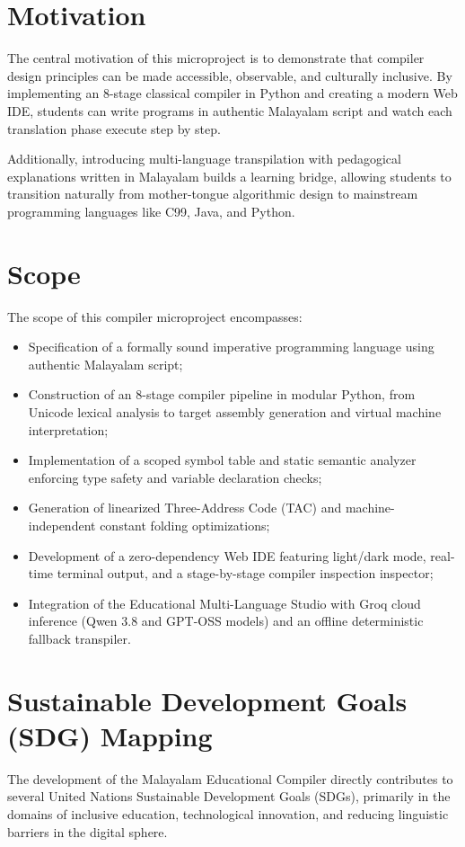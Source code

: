 \documentclass[12pt,a4paper]{report}
\begin{document}
\section{Motivation}
The central motivation of this microproject is to demonstrate that compiler design principles can be made accessible, observable, and culturally inclusive. By implementing an 8-stage classical compiler in Python and creating a modern Web IDE, students can write programs in authentic Malayalam script and watch each translation phase execute step by step.

Additionally, introducing multi-language transpilation with pedagogical explanations written in Malayalam builds a learning bridge, allowing students to transition naturally from mother-tongue algorithmic design to mainstream programming languages like C99, Java, and Python.

\section{Scope}
The scope of this compiler microproject encompasses:
\begin{itemize}
    \item Specification of a formally sound imperative programming language using authentic Malayalam script;
    \item Construction of an 8-stage compiler pipeline in modular Python, from Unicode lexical analysis to target assembly generation and virtual machine interpretation;
    \item Implementation of a scoped symbol table and static semantic analyzer enforcing type safety and variable declaration checks;
    \item Generation of linearized Three-Address Code (TAC) and machine-independent constant folding optimizations;
    \item Development of a zero-dependency Web IDE featuring light/dark mode, real-time terminal output, and a stage-by-stage compiler inspection inspector;
    \item Integration of the Educational Multi-Language Studio with Groq cloud inference (Qwen 3.8 and GPT-OSS models) and an offline deterministic fallback transpiler.
\end{itemize}

\section{Sustainable Development Goals (SDG) Mapping}
The development of the Malayalam Educational Compiler directly contributes to several United Nations Sustainable Development Goals (SDGs), primarily in the domains of inclusive education, technological innovation, and reducing linguistic barriers in the digital sphere. 
\end{document}
